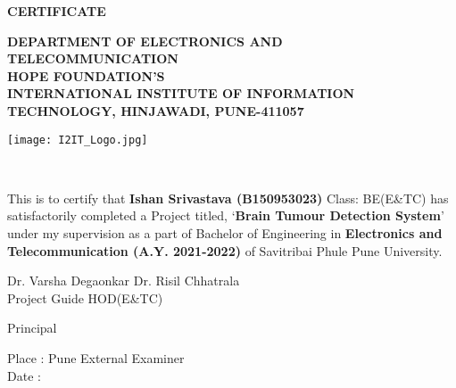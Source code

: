 \begin{center}
{\huge \bf CERTIFICATE}
\end{center}
\begin{center}
{\bf DEPARTMENT OF ELECTRONICS AND TELECOMMUNICATION}\\
{\bf HOPE FOUNDATION'S}\\
{\bf INTERNATIONAL INSTITUTE OF INFORMATION TECHNOLOGY, HINJAWADI, PUNE-411057}
\begin{figure*}[!h]
\centering
\texttt{[image: I2IT\_Logo.jpg]}
\end{figure*}\\
\end{center}
This is to certify that \textbf{Ishan Srivastava (B150953023)} Class: BE(E{\&}TC) has satisfactorily completed a Project titled, `\textbf{Brain Tumour Detection System}' under my supervision as a part of Bachelor of Engineering in \textbf{Electronics and Telecommunication (A.Y. 2021-2022)} of Savitribai Phule Pune University.

\vspace{20mm}
\noindent Dr. Varsha Degaonkar \hfill Dr. Risil Chhatrala \\
Project Guide \hfill HOD(E\&TC) \\ \vspace{0.5 cm}
\begin{center}
Principal
\end{center}
\noindent Place : Pune \hfill External Examiner \\
Date :